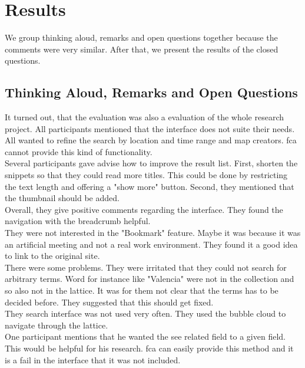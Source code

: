 \documentclass[11pt]{report}
\begin{document}
\section{Results}

We group thinking aloud, remarks and open questions together because the comments were very similar. After that, we present the results of the closed questions.

\subsection{Thinking Aloud, Remarks and Open Questions}
It turned out, that the evaluation was also a evaluation of the whole research project. All participants mentioned that the interface does not suite their needs. All wanted to refine the search by location and time range and map creators. \acrshort{fca} cannot provide this kind of functionality.\\

Several participants gave advise how to improve the result list. First, shorten the snippets so that they could read more titles. This could be done by restricting the text length and offering a "show more" button. Second, they mentioned that the thumbnail should be added. \\

Overall, they give positive comments regarding the interface. They found the navigation with the breadcrumb helpful. \\

They were not interested in the "Bookmark" feature. Maybe it was because it was an artificial meeting and not a real work environment. They found it a good idea to link to the original site. \\

There were some problems. They were irritated that they could not search for arbitrary terms. Word for instance like "Valencia" were not in the collection and so also not in the lattice. It was for them not clear that the terms has to be decided before. They suggested that this should get fixed. \\

They search interface was not used very often. They used the bubble cloud to navigate through the lattice. \\

One participant mentions that he wanted the see related field to a given field. This would be helpful for his research. \acrshort{fca} can easily provide this method and it is a fail in the interface that it was not included.\\
\end{document}
